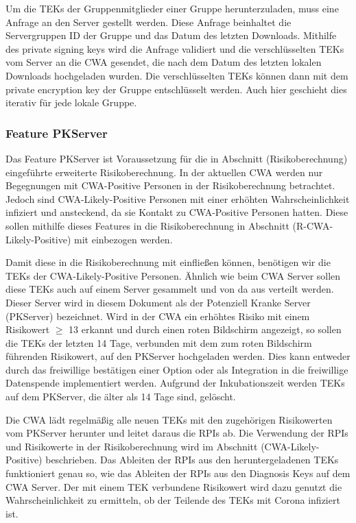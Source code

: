 \documentclass[conference]{IEEEtran}
\begin{document}
Um die TEKs der Gruppenmitglieder einer Gruppe herunterzuladen, muss eine Anfrage an den Server gestellt werden.
Diese Anfrage beinhaltet die Servergruppen ID der Gruppe und das Datum des letzten Downloads.
Mithilfe des private signing keys wird die Anfrage validiert und die verschlüsselten TEKs vom Server an die CWA gesendet, die nach dem Datum des letzten lokalen Downloads hochgeladen wurden.
Die verschlüsselten TEKs können dann mit dem private encryption key der Gruppe entschlüsselt werden.
Auch hier geschieht dies iterativ für jede lokale Gruppe.\\


\subsubsection{Feature PKServer}

Das Feature PKServer ist Voraussetzung für die in Abschnitt (Risikoberechnung) eingeführte erweiterte Risikoberechnung.
In der aktuellen CWA werden nur Begegnungen mit CWA-Positive Personen in der Risikoberechnung betrachtet.
Jedoch sind CWA-Likely-Positive Personen mit einer erhöhten Wahrscheinlichkeit infiziert und ansteckend, da sie Kontakt zu CWA-Positive Personen hatten.
Diese sollen mithilfe dieses Features in die Risikoberechnung in Abschnitt (R-CWA-Likely-Positive) mit einbezogen werden.

Damit diese in die Risikoberechnung mit einfließen können, benötigen wir die TEKs der CWA-Likely-Positive Personen.
Ähnlich wie beim CWA Server sollen diese TEKs auch auf einem Server gesammelt und von da aus verteilt werden.
Dieser Server wird in diesem Dokument als der Potenziell Kranke Server (PKServer) bezeichnet.
Wird in der CWA ein erhöhtes Risiko mit einem Risikowert $\geq$ 13 erkannt und durch einen roten Bildschirm angezeigt, so sollen die TEKs der letzten 14 Tage, verbunden mit dem zum roten Bildschirm führenden Risikowert, auf den PKServer hochgeladen werden.
Dies kann entweder durch das freiwillige bestätigen einer Option oder als Integration in die freiwillige Datenspende implementiert werden.
Aufgrund der Inkubationszeit werden TEKs auf dem PKServer, die älter als 14 Tage sind, gelöscht.

Die CWA lädt regelmäßig alle neuen TEKs mit den zugehörigen Risikowerten vom PKServer herunter und leitet daraus die RPIs ab.
Die Verwendung der RPIs und Risikowerte in der Risikoberechnung wird im Abschnitt (CWA-Likely-Positive) beschrieben.
Das Ableiten der RPIs aus den heruntergeladenen TEKs funktioniert genau so, wie das Ableiten der RPIs aus den Diagnosis Keys auf dem CWA Server.
Der mit einem TEK verbundene Risikowert wird dazu genutzt die Wahrscheinlichkeit zu ermitteln, ob der Teilende des TEKs mit Corona infiziert ist.
\end{document}
